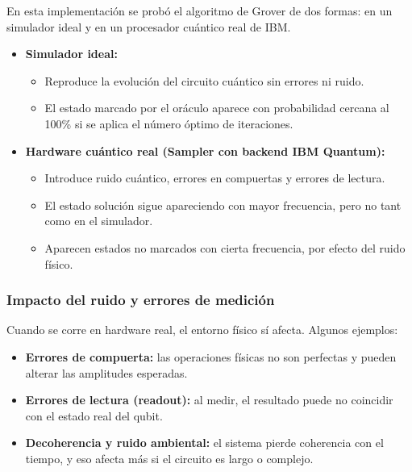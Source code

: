 \documentclass{article}
\begin{document}
En esta implementación se probó el algoritmo de Grover de dos formas: en un 
simulador ideal y en un procesador cuántico real de IBM.

\begin{itemize}
    \item \textbf{Simulador ideal:}
    \begin{itemize}
        \item Reproduce la evolución del circuito cuántico sin errores ni ruido.
        \item El estado marcado por el oráculo aparece con probabilidad 
                cercana al 100\% si se aplica el número óptimo de iteraciones.
    \end{itemize}

    \item \textbf{Hardware cuántico real (Sampler con backend IBM Quantum):}
    \begin{itemize}
        \item Introduce ruido cuántico, errores en compuertas y errores de lectura.
        \item El estado solución sigue apareciendo con mayor frecuencia, 
                pero no tant como en el simulador.
        \item Aparecen estados no marcados con cierta frecuencia, 
                por efecto del ruido físico.
    \end{itemize}
\end{itemize}

\subsubsection*{Impacto del ruido y errores de medición}

Cuando se corre en hardware real, el entorno físico sí afecta. Algunos ejemplos:

\begin{itemize}
    \item \textbf{Errores de compuerta:} las operaciones físicas no son perfectas y 
            pueden alterar las amplitudes esperadas.
    \item \textbf{Errores de lectura (readout):} al medir, el resultado puede no 
            coincidir con el estado real del qubit.
    \item \textbf{Decoherencia y ruido ambiental:} el sistema pierde coherencia con 
            el tiempo, y eso afecta más si el circuito es largo o complejo.
\end{itemize}
\end{document}
